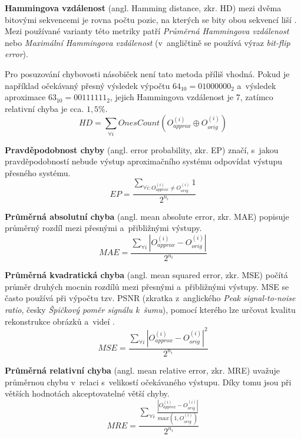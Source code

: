 \bigskip

\textbf{Hammingova vzdálenost} (angl. Hamming distance, zkr. HD) mezi dvěma bitovými sekvencemi je rovna počtu pozic, na kterých se bity obou sekvencí liší \cite{hamming_dist}. Mezi používané varianty této metriky patří \textit{Průměrná Hammingova vzdálenost} nebo \textit{Maximální Hammingova vzdálenost} (v~angličtině se používá výraz \textit{bit-flip error}).

Pro posuzování chybovosti násobiček není tato metoda příliš vhodná. Pokud je například očekávaný přesný výsledek výpočtu $64_{10} = 0100 0000_{2}$ a~výsledek aproximace $63_{10} = 0011 1111_{2}$, jejich Hammingova vzdálenost je 7, zatímco relativní chyba je cca. $1,5 \%$.
\begin{equation}
    HD = \sum_{\forall i} OnesCount(O_{approx}^{(i)} \oplus O_{orig}^{(i)})
\end{equation}

\textbf{Pravděpodobnost chyby} (angl. error probability, zkr. EP) značí, s~jakou pravděpodobností nebude výstup aproximačního systému odpovídat výstupu přesného systému.
\begin{equation}
    EP = \frac{\sum_{\forall {i:O_{approx}^{(i)} \neq O_{orig}^{(i)}}} 1} {2^{n_i}}
\end{equation}

\textbf{Průměrná absolutní chyba} (angl. mean absolute error, zkr. MAE) popisuje průměrný rozdíl mezi přesnými a~přibližnými výstupy.
\begin{equation}
    MAE = \frac{\sum_{\forall i} {\left|{{O_{approx}^{(i)} - O_{orig}^{(i)}}}\right|}} {2^{n_i}}
\end{equation}

\textbf{Průměrná kvadratická chyba} (angl. mean squared error, zkr. MSE) počítá průměr druhých mocnin rozdílů mezi přesnými a~přibližnými výstupy. MSE se často používá při výpočtu tzv. PSNR (zkratka z~anglického \textit{Peak signal-to-noise ratio}, česky \textit{Špičkový poměr signálu k~šumu}), pomocí kterého lze určovat kvalitu rekonstrukce obrázků a~videí \cite{error_metrics}.
\begin{equation}
    MSE = \frac{\sum_{\forall i} {\left|{{O_{approx}^{(i)} - O_{orig}^{(i)}}}\right|^2}} {2^{n_i}}
\end{equation}

\textbf{Průměrná relativní chyba} (angl. mean relative error, zkr. MRE) uvažuje průměrnou chybu v~relaci s~velikostí očekávaného výstupu. Díky tomu jsou při větších hodnotách akceptovatelné větší chyby.
\begin{equation}
    MRE = \frac{\sum_{\forall i} \frac{\left|{{O_{approx}^{(i)} - O_{orig}^{(i)}}}\right|} {max(1,O_{orig}^{(i)})}} {2^{n_i}}
\end{equation}

